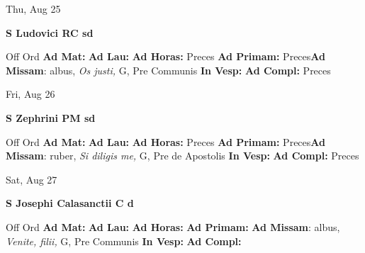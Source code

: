 \documentclass[10pt]{memoir}
\begin{document}
\begin{center}
\begin{minipage}{3.5in}
\vspace{2em}
\begin{center}Thu, Aug 25
\end{center}
\textbf{ \large S Ludovici RC
\textnormal{\normalsize sd}}

\begin{justify}Off Ord
\textbf{Ad Mat: }
\textbf{Ad Lau: }
\textbf{Ad Horas: }Preces
\textbf{Ad Primam: }Preces\textbf{Ad Missam}: albus, \textit{Os justi,} G, Pre Communis
\textbf{In Vesp: }
\textbf{Ad Compl: }Preces
\end{justify}
\end{minipage}
\end{center}

\begin{center}
\begin{minipage}{3.5in}
\vspace{2em}
\begin{center}Fri, Aug 26
\end{center}
\textbf{ \large S Zephrini PM
\textnormal{\normalsize sd}}

\begin{justify}Off Ord
\textbf{Ad Mat: }
\textbf{Ad Lau: }
\textbf{Ad Horas: }Preces
\textbf{Ad Primam: }Preces\textbf{Ad Missam}: ruber, \textit{Si diligis me,} G, Pre de Apostolis
\textbf{In Vesp: }
\textbf{Ad Compl: }Preces
\end{justify}
\end{minipage}
\end{center}

\begin{center}
\begin{minipage}{3.5in}
\vspace{2em}
\begin{center}Sat, Aug 27
\end{center}
\textbf{ \large S Josephi Calasanctii C
\textnormal{\normalsize d}}

\begin{justify}Off Ord
\textbf{Ad Mat: }
\textbf{Ad Lau: }
\textbf{Ad Horas: }
\textbf{Ad Primam: }\textbf{Ad Missam}: albus, \textit{Venite, filii,} G, Pre Communis
\textbf{In Vesp: }
\textbf{Ad Compl: }
\end{justify}
\end{minipage}
\end{center}
\end{document}
